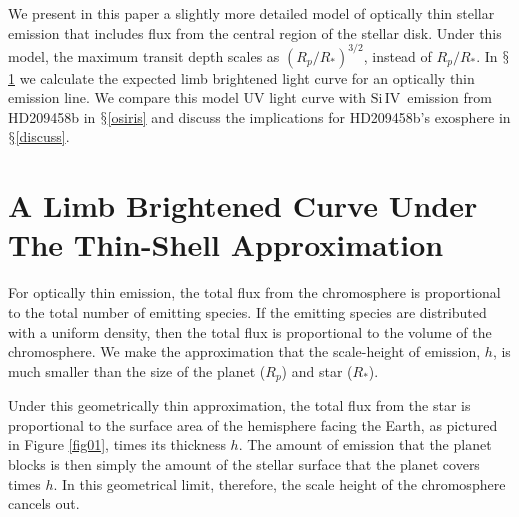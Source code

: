 \documentclass[twocolumn]{emulateapj}
\newcommand{\siIV}{\ensuremath{\mathrm{Si}\,\scriptstyle \mathrm{IV}}}
\begin{document}
We present in this paper a slightly more detailed model of optically thin stellar emission that includes flux from the central region of the stellar disk. Under this model, the maximum transit depth scales as $(R_p/R_*)^{3/2}$, instead of $R_p/R_*$. In
$\mathsection$\ref{labl:chromlcurve} we calculate the expected limb
brightened light curve for an optically thin emission line. We
compare this model UV light curve with \siIV\ emission from HD209458b in  $\mathsection$\ref{osiris} and discuss the implications for HD209458b's exosphere in $\mathsection$\ref{discuss}.

\section{A Limb Brightened Curve Under The Thin-Shell Approximation} \label{labl:chromlcurve}
\label{labl:thinshell}

For optically thin emission, the total flux from the chromosphere is proportional to the total number of emitting species. If the emitting species are distributed with a uniform density, then the total flux is proportional to the volume of the chromosphere. We make the approximation that the scale-height of emission, $h$, is much smaller than the size of the planet ($R_p$) and star ($R_*$).

Under this geometrically thin approximation, the total flux from the star is proportional to the surface area of the hemisphere facing the Earth, as pictured in Figure \ref{fig01}, times its thickness $h$. The amount of emission that the planet blocks is then simply the amount of the stellar surface that the planet covers times $h$. In this geometrical limit, therefore, the scale height of the chromosphere cancels out.


\end{document}

